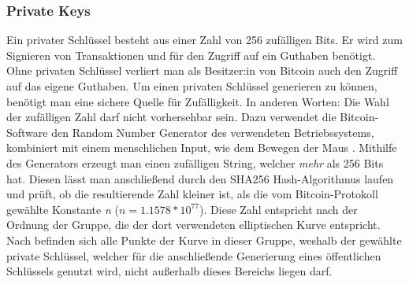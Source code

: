 \subsubsection{Private Keys}
Ein privater Schlüssel besteht aus einer Zahl von 256 zufälligen Bits. Er wird zum Signieren von Transaktionen und für den Zugriff auf ein Guthaben benötigt. Ohne privaten Schlüssel verliert man als Besitzer:in von Bitcoin auch den Zugriff auf das eigene Guthaben.
Um einen privaten Schlüssel generieren zu können, benötigt man eine sichere Quelle für Zufälligkeit. In anderen Worten: Die Wahl der zufälligen Zahl darf nicht vorhersehbar sein. Dazu verwendet die Bitcoin-Software den Random Number Generator des verwendeten Betriebssystems, kombiniert mit einem menschlichen Input, wie dem Bewegen der Maus \cite[S. 58]{antanopoulos_2014}. Mithilfe des Generators erzeugt man einen zufälligen String, welcher \emph{mehr} als 256 Bits hat. Diesen lässt man anschließend durch den SHA256 Hash-Algorithmus laufen und prüft, ob die resultierende Zahl kleiner ist, als die vom Bitcoin-Protokoll gewählte Konstante \emph{n} ($n = 1.1578 * 10^{77}$). Diese Zahl entspricht nach \cite{corbellini_2015} der Ordnung der Gruppe, die der dort verwendeten elliptischen Kurve entspricht. Nach \cite{corbellini_2015} befinden sich alle Punkte der Kurve in dieser Gruppe, weshalb der gewählte private Schlüssel, welcher für die anschließende Generierung eines öffentlichen Schlüssels genutzt wird, nicht außerhalb dieses Bereichs liegen darf.

